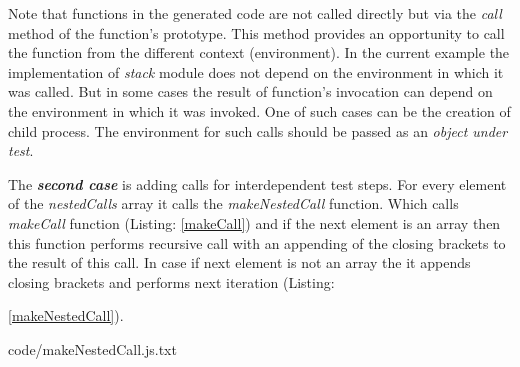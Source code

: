 Note that functions in the generated code are not called directly but via the \textit{call} method of the function's prototype. This method provides an opportunity to call the function from the different context (environment). In the current example the implementation of \textit{stack} module does not depend on the environment in which it was called. But in some cases the result of function's invocation can depend on the environment in which it was invoked. One of such cases can be the creation of child process. The environment for such calls should be passed as an \textit{object under test}.


The \textit{\textbf{second case}} is adding calls for interdependent test steps. For every  element of the \textit{nestedCalls} array it calls the  \textit{makeNestedCall} function. Which calls \textit{makeCall} function (Listing: \ref{makeCall}) and if the next element is an array then this function performs recursive call with an appending of the closing brackets to the result of this call. In case if next element is not an array the it appends closing brackets and performs next iteration (Listing: {\ref{makeNestedCall}).




{code/makeNestedCall.js.txt}


%
%


}
